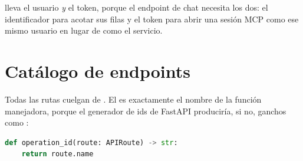  lleva el usuario \emph{y} el token, porque el endpoint de chat
necesita los dos: el identificador para acotar sus filas y el token para abrir
una sesión MCP como ese mismo usuario en lugar de como el servicio.

\section{Catálogo de endpoints}

Todas las rutas cuelgan de . El  es
exactamente el nombre de la función manejadora, porque el generador de ids de
FastAPI produciría, si no, ganchos como
:

\begin{lstlisting}[language=Python]
def operation_id(route: APIRoute) -> str:
    return route.name
\end{lstlisting}

